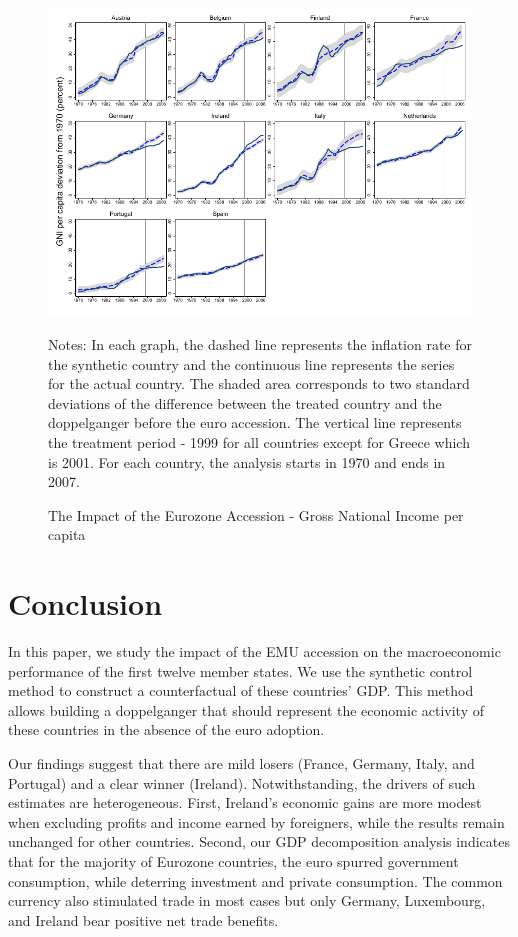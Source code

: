 \documentclass[12pt]{article}
\newcommand{\annote}[1]{\parbox{\textwidth}{\renewcommand{\baselinestretch}{1.0}\vspace{12pt} \small Notes: #1}}
\begin{document}
\begin{figure}[h!]
    \centering
    \caption{The Impact of the Eurozone Accession - Gross National Income per capita}
    \includegraphics[width=\textwidth]{Output/Figures/SCM_gnipc_Annual.pdf}
    \annote{In each graph, the dashed line represents the inflation rate for the synthetic country and the continuous line represents the series for the actual country. The shaded area corresponds to two standard deviations of the difference between the treated country and the doppelganger before the euro accession. The vertical line represents the treatment period - 1999 for all countries except for Greece which is 2001. For each country, the analysis starts in 1970 and ends in 2007.}
    \label{F_GNI}
\end{figure}


\section{Conclusion \label{S_Conclusion}}
In this paper, we study the impact of the EMU accession on the macroeconomic performance of the first twelve member states. We use the synthetic control method to construct a counterfactual of these countries' GDP. This method allows building a doppelganger that should represent the economic activity of these countries in the absence of the euro adoption. 

Our findings suggest that there are mild losers (France, Germany, Italy, and Portugal) and a clear winner (Ireland). Notwithstanding, the drivers of such estimates are heterogeneous.  First, Ireland's economic gains are more modest when excluding profits and income earned by foreigners, while the results remain unchanged for other countries. Second,  our GDP decomposition analysis indicates that for the majority of Eurozone countries, the euro spurred government consumption, while deterring investment and private consumption. The common currency also stimulated trade in most cases but only Germany, Luxembourg, and Ireland bear positive net trade benefits.  
\end{document}
